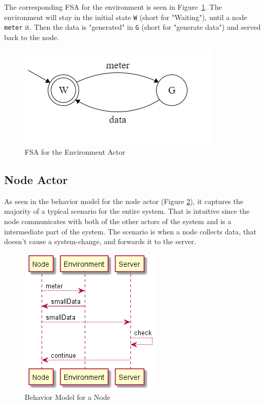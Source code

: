 The corresponding FSA for the environment is seen in Figure~\ref{fig:env_states}. The environment will stay in the initial state \texttt{W} (short for "Waiting"), until a node \texttt{meter} it. Then the data is "generated" in \texttt{G} (short for "generate data") and served back to the node.  


\begin{figure}
    \includegraphics{include/figures/environment_actor}
    \caption{FSA for the Environment Actor}
    \label{fig:env_states}
\end{figure}

\subsection{Node Actor}

As seen in the behavior model for the node actor (Figure \ref{fig:node_behav_smallData}), it captures the majority of a typical scenario for the entire system. That is intuitive since the node communicates with both of the other actors of the system and is a intermediate part of the system. The scenario is when a node collects data, that doesn't cause a system-change, and forwards it to the server.

\begin{figure}[ht]
    \includegraphics[scale=1]{include/figures/node_behav_smallData}
    \caption{Behavior Model for a Node}
    \label{fig:node_behav_smallData}
\end{figure}

